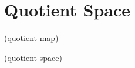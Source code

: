 \chapter{Quotient Space}

\begin{definition}
(quotient map)
\end{definition}

\begin{definition}
(quotient space)
\end{definition}










